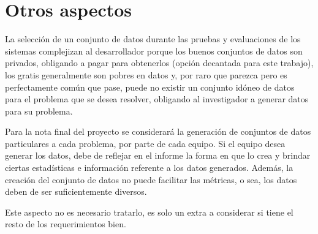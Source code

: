 \documentclass[10pt]{article}
\begin{document}
	\section*{Otros aspectos}
	
		La selección de un conjunto de datos durante las pruebas y evaluaciones de los sistemas complejizan al desarrollador porque los buenos conjuntos de datos son privados, obligando a pagar para obtenerlos (opción decantada para este trabajo), los gratis generalmente son pobres en datos y, por raro que parezca pero es perfectamente común que pase, puede no existir un conjunto idóneo de datos para el problema que se desea resolver, obligando al investigador a generar datos para su problema. 
		
		Para la nota final del proyecto se considerará la generación de conjuntos de datos particulares a cada problema, por parte de cada equipo. Si el equipo desea generar los datos, debe de reflejar en el informe la forma en que lo crea y brindar ciertas estadísticas e información referente a los datos generados. Además, la creación del conjunto de datos no puede facilitar las métricas, o sea, los datos deben de ser suficientemente diversos.
		
		Este aspecto no es necesario tratarlo, es solo un extra a considerar si tiene el resto de los requerimientos bien.
		
		

	
\end{document}
